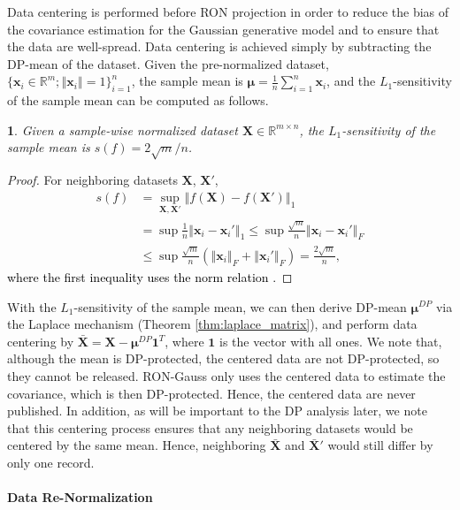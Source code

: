 \documentclass[USenglish,oneside,twocolumn]{article}
\theoremstyle{definition}
\theoremstyle{remark}
\theoremstyle{plain}
\theoremstyle{plain}
\newtheorem{lem}{\protect\lemmaname}
\providecommand{\lemmaname}{Lemma}
\newcommand{\chang}{\textcolor{black}}
\begin{document}
Data centering is performed before RON projection in order to reduce
the bias of the covariance estimation for the Gaussian generative
model and to ensure that the data are well-spread.
Data centering is achieved simply by subtracting the DP-mean of the
dataset. Given the pre-normalized dataset, $\{\mathbf{x}_{i}\in\mathbb{R}^{m};\left\Vert \mathbf{x}_{i}\right\Vert =1\}_{i=1}^{n}$,
the sample mean is $\boldsymbol{\mu}=\frac{1}{n}\sum_{i=1}^{n}\mathbf{x}_{i}$,
and the $L_{1}$-sensitivity of the sample mean can be computed as
follows.
\begin{lem}
\label{lem:sens_mean}Given a sample-wise normalized dataset $\mathbf{X}\in\mathbb{R}^{m\times n}$,
the $L_{1}$-sensitivity of the sample mean is $s(f)=2\sqrt{m}/n$.
\end{lem}
\begin{proof}
For neighboring datasets $\mathbf{X}$, $\mathbf{X}'$,
\begin{align*}
s(f) & =\sup_{\mathbf{X},\mathbf{X}'}\left\Vert f(\mathbf{X})-f(\mathbf{X}')\right\Vert _{1}\\
 & =\sup\frac{1}{n}\left\Vert \mathbf{x}_{i}-\mathbf{x}_{i}'\right\Vert _{1}\leq\sup\frac{\sqrt{m}}{n}\left\Vert \mathbf{x}_{i}-\mathbf{x}_{i}'\right\Vert _{F}\\
 & \leq\sup\frac{\sqrt{m}}{n}(\left\Vert \mathbf{x}_{i}\right\Vert _{F}+\left\Vert \mathbf{x}_{i}'\right\Vert _{F})=\frac{2\sqrt{m}}{n},
\end{align*}
\chang{where the first inequality uses the norm relation \cite[page 333]{RefWorks:208}.}
\end{proof}
With the $L_{1}$-sensitivity of the sample mean, we can then derive
DP-mean $\boldsymbol{\mu}^{DP}$ via the Laplace mechanism (Theorem
\ref{thm:laplace_matrix}), and perform data centering by $\bar{\mathbf{X}}=\mathbf{X}-\boldsymbol{\mu}^{DP}\mathbf{1}^{T}$,
where $\mathbf{1}$ is the vector with all ones. We note that, although
the mean is DP-protected, the centered data are not DP-protected,
so they cannot be released. RON-Gauss only uses the centered data
to estimate the covariance, which is then DP-protected. Hence, the centered data are never published.
In addition, as will be important to the DP analysis later, we
note that this centering process ensures that any neighboring datasets
would be centered by the same mean. Hence, neighboring $\bar{\mathbf{X}}$
and $\bar{\mathbf{X}}'$ would still differ by only one record.

\vspace{-1em}
\paragraph{Data Re-Normalization}
\end{document}
